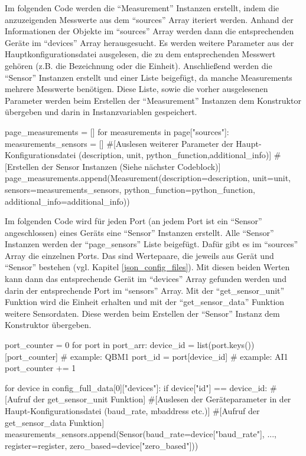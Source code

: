 Im folgenden Code werden die \enquote{Measurement} Instanzen erstellt, indem die anzuzeigenden Messwerte aus dem \enquote{sources} Array iteriert werden. Anhand der Informationen der Objekte im \enquote{sources} Array werden dann die entsprechenden Geräte im \enquote{devices} Array herausgesucht. Es werden weitere Parameter aus der Hauptkonfigurationsdatei ausgelesen, die zu dem entsprechenden Messwert gehören (z.B. die Bezeichnung oder die Einheit). Anschließend werden die \enquote{Sensor} Instanzen erstellt und einer Liste beigefügt, da manche Measurements mehrere Messwerte benötigen. Diese Liste, sowie die vorher ausgelesenen Parameter werden beim Erstellen der \enquote{Measurement} Instanzen dem Konstruktor übergeben und darin in Instanzvariablen gespeichert.
\begin{pythoncode}
page_measurements = []
for measurements in page["sources"]:
	measurements_sensors = []
	#[Auslesen weiterer Parameter der Haupt-Konfigurationsdatei (description, unit, python_function,additional_info)]
	#[Erstellen der Sensor Instanzen (Siehe nächster Codeblock)]
	page_measurements.append(Measurement(description=description, unit=unit, sensors=measurements_sensors, python_function=python_function, additional_info=additional_info))
\end{pythoncode}

Im folgenden Code wird für jeden Port (an jedem Port ist ein \enquote{Sensor} angeschlossen) eines Geräts eine \enquote{Sensor} Instanzen erstellt. Alle \enquote{Sensor} Instanzen werden der \enquote{page\_sensors} Liste beigefügt. Dafür gibt es im \enquote{sources} Array die einzelnen Ports. Das sind Wertepaare, die jeweils aus Gerät und \enquote{Sensor} bestehen (vgl. Kapitel \ref{json_config_files}). Mit diesen beiden Werten kann dann das entsprechende Gerät im \enquote{devices} Array gefunden werden und darin der entsprechende Port im \enquote{sensors} Array. Mit der \enquote{get\_sensor\_unit} Funktion wird die Einheit erhalten und mit der \enquote{get\_sensor\_data} Funktion weitere Sensordaten. Diese werden beim Erstellen der \enquote{Sensor} Instanz dem Konstruktor übergeben.
\begin{pythoncode}
port_counter = 0
for port in port_arr:
	device_id = list(port.keys())[port_counter] # example: QBM1
	port_id = port[device_id]  # example: AI1
	port_counter += 1
	
	for device in config_full_data[0]["devices"]:
		if device["id"] == device_id:
			#[Aufruf der get_sensor_unit Funktion]
			#[Auslesen der Geräteparameter in der Haupt-Konfigurationsdatei (baud_rate, mbaddress etc.)]
			#[Aufruf der get_sensor_data Funktion]
			measurements_sensors.append(Sensor(baud_rate=device["baud_rate"], ..., register=register, zero_based=device["zero_based"]))
\end{pythoncode}

